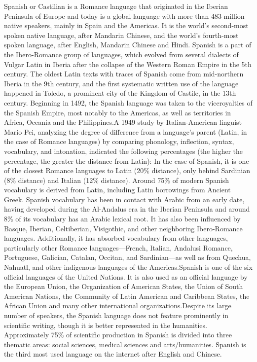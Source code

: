 \documentclass[11pt]{scrartcl} %
\begin{document}
Spanish or Castilian is a Romance language that originated in the Iberian Peninsula of Europe and today is a global language with more than 483 million native speakers, mainly in Spain and the Americas. It is the world's second-most spoken native language, after Mandarin Chinese, and the world's fourth-most spoken language, after English, Mandarin Chinese and Hindi. Spanish is a part of the Ibero-Romance group of languages, which evolved from several dialects of Vulgar Latin in Iberia after the collapse of the Western Roman Empire in the 5th century. The oldest Latin texts with traces of Spanish come from mid-northern Iberia in the 9th century, and the first systematic written use of the language happened in Toledo, a prominent city of the Kingdom of Castile, in the 13th century. Beginning in 1492, the Spanish language was taken to the viceroyalties of the Spanish Empire, most notably to the Americas, as well as territories in Africa, Oceania and the Philippines.A 1949 study by Italian-American linguist Mario Pei, analyzing the degree of difference from a language's parent (Latin, in the case of Romance languages) by comparing phonology, inflection, syntax, vocabulary, and intonation, indicated the following percentages (the higher the percentage, the greater the distance from Latin): In the case of Spanish, it is one of the closest Romance languages to Latin (20\% distance), only behind Sardinian (8\% distance) and Italian (12\% distance). Around 75\% of modern Spanish vocabulary is derived from Latin, including Latin borrowings from Ancient Greek. Spanish vocabulary has been in contact with Arabic from an early date, having developed during the Al-Andalus era in the Iberian Peninsula and around 8\% of its vocabulary has an Arabic lexical root. It has also been influenced by Basque, Iberian, Celtiberian, Visigothic, and other neighboring Ibero-Romance languages. Additionally, it has absorbed vocabulary from other languages, particularly other Romance languages—French, Italian, Andalusi Romance, Portuguese, Galician, Catalan, Occitan, and Sardinian—as well as from Quechua, Nahuatl, and other indigenous languages of the Americas.Spanish is one of the six official languages of the United Nations. It is also used as an official language by the European Union, the Organization of American States, the Union of South American Nations, the Community of Latin American and Caribbean States, the African Union and many other international organizations.Despite its large number of speakers, the Spanish language does not feature prominently in scientific writing, though it is better represented in the humanities. Approximately 75\% of scientific production in Spanish is divided into three thematic areas: social sciences, medical sciences and arts/humanities. Spanish is the third most used language on the internet after English and Chinese. \par
\end{document}
